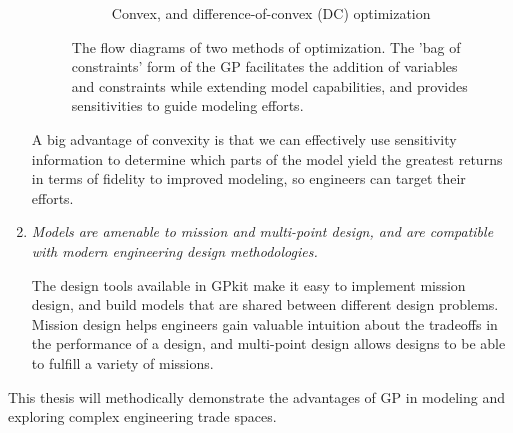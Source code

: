\begin{enumerate}
\begin{figure*}[!b]
\begin{subfigure}[b]{0.5\linewidth}
\begin{center}
{}
            \end{center}
            \caption{Convex, and difference-of-convex (DC) optimization}
        \end{subfigure}
        \caption{The flow diagrams of two methods of optimization. The 'bag of constraints'
        form of the GP facilitates the addition of variables and constraints while extending
        model capabilities, and provides sensitivities to guide modeling efforts.}
        \label{f:optflow}
    \end{figure*}

    A big advantage of convexity is that we can effectively use sensitivity information
    to determine which parts of the
    model yield the greatest returns in terms of fidelity to improved modeling, so engineers can target
    their efforts.

    \item \textit{Models are amenable to mission and multi-point design, and are compatible with modern
    engineering design methodologies.}

    The design tools available in GPkit make it easy to
    implement mission design, and build models that are shared between
    different design problems. Mission design helps engineers gain valuable intuition about
    the tradeoffs in the performance of a design, and multi-point design allows designs to
    be able to fulfill a variety of missions.

\end{enumerate}

This thesis will methodically demonstrate the advantages of \gls{GP} in modeling
and exploring complex engineering trade spaces.



